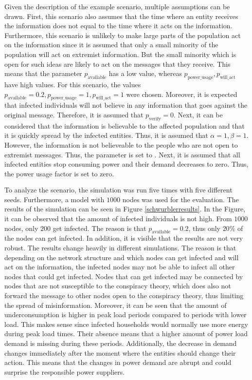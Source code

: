 Given the description of the example scenario, multiple assumptions can be drawn.
First, this scenario also assumes that the time where an entity receives the
information does not equal to the time where it acts on the information.
Furthermore, this scenario is unlikely to make large parts of the population
act on the information since it is assumed that only a small minority
of the population will act on extremist information. But the small 
minority which is open for such ideas are likely to act on the 
messages that they receive.
This means that the parameter $p_{\mathrm{available}}$ has a low value,
whereas $p_{\mathrm{power\_usage}}, p_{\mathrm{will\_act}}$
have high values. For this scenario, the values 
$p_{\mathrm{available}}=0.2, 
p_{\mathrm{power\_usage}}=1, p_{\mathrm{will\_act}}=1$
were chosen.
Moreover, it is expected that infected individuals will not 
believe in any information that goes against the original message.
Therefore, it is assumed that $p_{\mathrm{verify}}=0$. Next, it
can be considered that the information is believable to 
the affected population and that it is quickly spread by 
the infected entities. Thus, it is assumed that $\alpha=1, \beta=1$.
However, the information is not believeable to the people 
who are not open to extremist messages. Thus, the 
parameter  is set to .
Next, it is assumed that all infected entities 
stop consuming power and their demand decreases to zero. Thus,
the power usage factor  is set to zero.

To analyze the scenario, the simulation was run five times with five 
different seeds. Furthermore, a model with $1000$ nodes was used 
for the evaluation. The results of the simulation can be seen in
Figure \ref{schwurblerresults}. In the Figure, it can be 
observed that the amount of infected individuals is not high.
From $1000$ nodes, only $200$ get infected. The reason is 
that $p_{\mathrm{available}}=0.2$, thus only $20\%$ of the nodes
can get infected. In addition, it is visible that the results 
are not very robust. The results change heavily in different 
simulations. The reason is that depending on the network structure
and which nodes can get infected and will act on the information, 
the infected nodes may not be able to infect all other nodes
that could get infected. Nodes that can get infected may be 
connected by nodes that are not susceptible to the conspiracy 
theory, which does also not forward the message to other nodes
open to the conspiracy theory, thus limiting the 
spread of misinformation.
Moreover, it can be seen that the amount of underconsumption
is higher in peak load periods compared to periods with 
lower load. This makes sense since infected households would 
normally use more energy during peak load times. Their absence
means that a higher amount of power load demand is missing 
during these periods. Additionally, the decrease in demand 
changes immediately after the moment where the entities 
should change their action. This means that the changes 
in power demand are abrupt and could surprise the responsible 
power suppliers.

